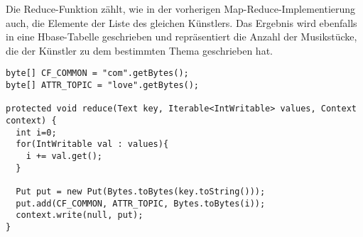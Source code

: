 Die Reduce-Funktion zählt, wie in der vorherigen Map-Reduce-Implementierung auch, die Elemente der Liste des gleichen Künstlers.
Das Ergebnis wird ebenfalls in eine Hbase-Tabelle geschrieben und repräsentiert die Anzahl der Musikstücke, die der
Künstler zu dem bestimmten Thema geschrieben hat.

\begin{lstlisting}[caption={Reduce-Funktion zur Suche nach Musikstücken eines Themas}, label=mapreduce:songsWithTopicSongsReduce]
byte[] CF_COMMON = "com".getBytes();
byte[] ATTR_TOPIC = "love".getBytes();

protected void reduce(Text key, Iterable<IntWritable> values, Context context) {
  int i=0;
  for(IntWritable val : values){
    i += val.get();
  }
            
  Put put = new Put(Bytes.toBytes(key.toString()));
  put.add(CF_COMMON, ATTR_TOPIC, Bytes.toBytes(i));
  context.write(null, put);
}
\end{lstlisting}